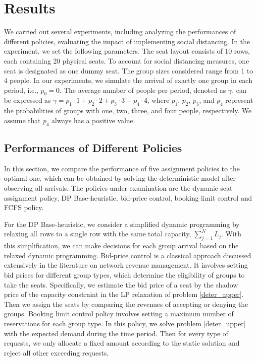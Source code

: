\section{Results}
We carried out several experiments, including analyzing the performances of different policies, evaluating the impact of implementing social distancing.
In the experiment, we set the following parameters. The seat layout consists of 10 rows, each containing 20 physical seats. To account for social distancing measures, one seat is designated as one dummy seat. The group sizes considered range from 1 to 4 people. In our experiments, we simulate the arrival of exactly one group in each period, i.e., $p_0 = 0$. The average number of people per period, denoted as $\gamma$, can be expressed as $\gamma = p_1 \cdot 1 + p_2 \cdot 2 + p_3 \cdot 3 + p_4 \cdot 4$, where $p_1$, $p_2$, $p_3$, and $p_4$ represent the probabilities of groups with one, two, three, and four people, respectively. We assume that $p_4$ always has a positive value. 


\subsection{Performances of Different Policies}
In this section, we compare the performance of five assignment policies to the optimal one, which can be obtained by solving the deterministic model after observing all arrivals. The policies under examination are the dynamic seat assignment policy, DP Base-heuristic, bid-price control, booking limit control and FCFS policy. 

For the DP Base-heuristic, we consider a simplified dynamic programming by relaxing all rows to a single row with the same total capacity, $\sum_{j=1}^{N} L_j$. With this simplification, we can make decisions for each group arrival based on the relaxed dynamic programming. Bid-price control is a classical approach discussed extensively in the literature on network revenue management. It involves setting bid prices for different group types, which determine the eligibility of groups to take the seats. Specifically, we estimate the bid price of a seat by the shadow price of the capacity constraint in the LP relaxation of problem \eqref{deter_upper}. Then we assign the seats by comparing the revenues of accepting or denying the groups. Booking limit control policy involves setting a maximum number of reservations for each group type. In this policy, we solve problem \eqref{deter_upper} with the expected demand during the time period. Then for every type of requests, we only allocate a fixed amount according to the static solution and reject all other exceeding requests.

